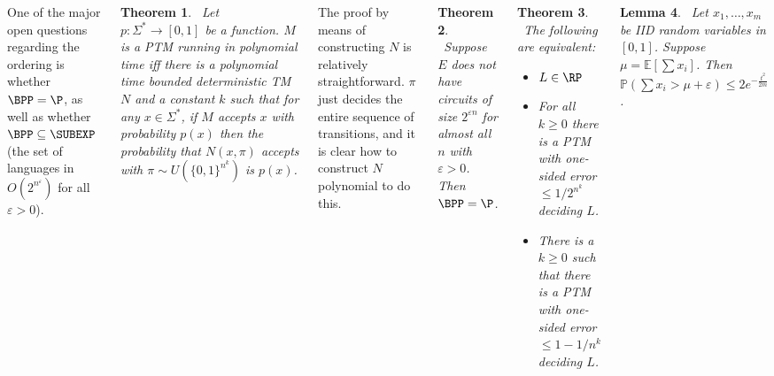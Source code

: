 \documentclass{tikzposter} %
\newtheorem{theorem}{Theorem}
\newtheorem{lemma}[theorem]{Lemma}
\begin{document}
\begin{columns}
{  One of the major open questions regarding the ordering is whether $\BPP = \P$, as well as whether $\BPP \subseteq \SUBEXP$ (the set of languages in $O(2^{n^{\varepsilon}})$ for all $\varepsilon >0$). \\

  \begin{theorem}
  \ Let $p : \Sigma^{*} \to [0,1]$ be a function. $M$ is a PTM running in polynomial time iff there is a polynomial time bounded deterministic TM $N$ and a constant $k$ such that for any $x \in \Sigma^{*}$, if $M$ accepts $x$ with probability $p(x)$ then the probability that $N(x,\pi)$ accepts with $\pi \sim U(\{0,1\}^{n^{k}})$ is $p(x)$.
  \end{theorem}
  \hphantom{}

  The proof by means of constructing $N$ is relatively straightforward. $\pi$ just decides the entire sequence of transitions, and it is clear how to construct $N$ polynomial to do this. \\

  \begin{theorem}
  \ Suppose $E$ does not have circuits of size $2^{\varepsilon n}$ for almost all $n$ with $\varepsilon > 0$. Then $\BPP = \P$.
  \end{theorem}
  \hphantom{}

  \begin{theorem}
    \ The following are equivalent:
    \begin{itemize}
    \item $L \in \RP$
    \item For all $k \ge 0$ there is a PTM with one-sided error $\le 1/2^{n^{k}}$ deciding $L$.
    \item There is a $k \ge 0$ such that there is a PTM with one-sided error $\le 1-1/n^{k}$ deciding $L$.
    \end{itemize}
  \end{theorem}
  \hphantom{}

  \begin{lemma}
  \ Let $x_{1},\dots,x_{m}$ be IID random variables in $[0,1]$. Suppose $\mu = \mathbb{E}[\sum x_{i}]$. Then $\mathbb{P}(\sum x_{i} > \mu + \varepsilon) \le 2e^{-\frac{t^{2}}{2m}}$.
  \end{lemma}
  \hphantom{}


}
\end{columns}
\end{document}
